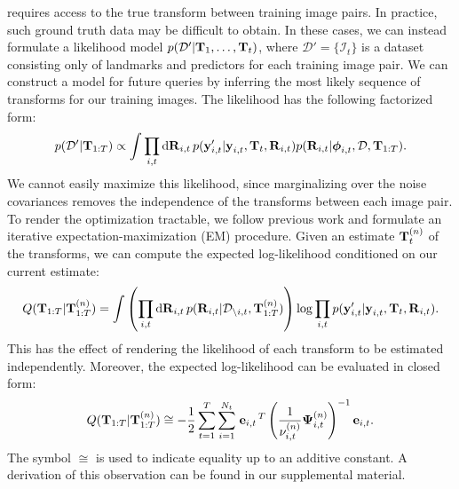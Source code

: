  requires access to the true transform between
training image pairs.  In practice, such ground truth data may be difficult
to obtain.  In these cases, we can instead formulate a likelihood model $p(\mathcal{D}' \vert
\boldsymbol{\mathbf{T}}_1, \dots, \boldsymbol{\mathbf{T}}_t)$, where $\mathcal{D}' = \{\mathcal{I}_t\}$ is a dataset consisting only of
landmarks and predictors for each training image pair. We can construct a model
for future queries by inferring the most likely sequence of transforms for our
training images.  The likelihood has the following factorized form:
\begin{equation}
  p(\mathcal{D}' \vert \boldsymbol{\mathbf{T}}_{1:T}) \propto \int \prod_{i,t}
  \mathrm{d}\boldsymbol{\mathbf{R}}_{i,t}\,
  p(\boldsymbol{\mathbf{y}}_{i, t}' \vert \boldsymbol{\mathbf{y}}_{i, t}, 
    \boldsymbol{\mathbf{T}}_t, \boldsymbol{\mathbf{R}}_{i,t}) p(\boldsymbol{\mathbf{R}}_{i,t}\vert \boldsymbol{\mathbf{\phi}}_{i,t},
    \mathcal{D}, \boldsymbol{\mathbf{T}}_{1:T}).
\end{equation}
We cannot easily maximize this likelihood, since marginalizing over the
noise covariances removes the independence of the transforms between
each image pair. To render the optimization tractable, we follow previous work \citep{VegaBrown:2013fv} and formulate an iterative expectation-maximization (EM)
procedure. Given an estimate $\boldsymbol{\mathbf{T}}_{t}^{(n)}$ of the transforms, we can
compute the expected log-likelihood conditioned on our current estimate: 
\begin{equation}
  Q(\boldsymbol{\mathbf{T}}_{1:T} \vert \boldsymbol{\mathbf{T}}_{1:T}^{(n)}) = 
    \int \left(\prod_{i,t}\mathrm{d}\boldsymbol{\mathbf{R}}_{i,t}
      \,p(\boldsymbol{\mathbf{R}}_{i,t} | \mathcal{D}_{\setminus
        i,t},
      \boldsymbol{\mathbf{T}}_{1:T}^{(n)})\right) \log \prod_{i,t} p(\boldsymbol{\mathbf{y}}_{i, t}' \vert
      \boldsymbol{\mathbf{y}}_{i, t}, \boldsymbol{\mathbf{T}}_t,
      \boldsymbol{\mathbf{R}}_{i,t}).
\end{equation}
This has the effect of rendering the likelihood of each transform to be
estimated independently.  Moreover, the expected log-likelihood can be
evaluated in closed form:
\begin{align}
  Q(\boldsymbol{\mathbf{T}}_{1:T} | \boldsymbol{\mathbf{T}}_{1:T}^{(n)}) \cong -\frac{1}{2}\sum_{t=1}^T
  \sum_{i=1}^{N_t} \left.{\boldsymbol{\mathbf{e}}_{i,t}}\right.^T
  \left(\frac{1}{\nu_{i,t}^{(n)}}\boldsymbol{\mathbf{\Psi}}_{i,t}^{(n)}\right)^{-1}
  \boldsymbol{\mathbf{e}}_{i,t}.
\end{align}
The symbol $\cong$ is used to indicate equality up to an additive constant. 
A derivation of this observation can be found in our supplemental material.

